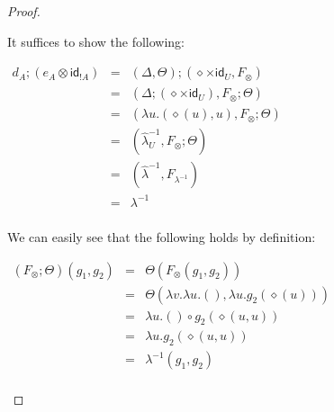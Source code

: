 \documentclass{elsarticle}
\newcommand{\id}[0]{\mathsf{id}}
\begin{document}
\begin{proof}
\begin{report}
\begin{itemize}
    It suffices to show the following:
    \begin{center}
      \begin{math}
        \begin{array}{lll}
          d_A;(e_A \otimes \id_{!A})
          & = & (\Delta,\Theta);(\diamond \times \id_U,F_\otimes)\\
          & = & (\Delta;(\diamond \times \id_U),F_\otimes;\Theta)\\
          & = & (\lambda u.(\diamond(u),u),F_\otimes;\Theta)\\
          & = & (\hat{\lambda}^{-1}_U,F_\otimes;\Theta)\\
          & = & (\hat{\lambda}^{-1},F_{\lambda^{-1}})\\
          & = & \lambda^{-1}\\
        \end{array}
      \end{math}
    \end{center}
    We can easily see that the following holds by definition:
    \begin{center}
      \begin{math}
        \begin{array}{lll}
          (F_\otimes;\Theta)(g_1,g_2)
          & = & \Theta(F_\otimes(g_1,g_2))\\
          & = & \Theta(\lambda v.\lambda u.(),\lambda u.g_2(\diamond(u)))\\
          & = & \lambda u.() \circ g_2(\diamond(u,u))\\
          & = & \lambda u.g_2(\diamond(u,u))\\
          & = & \lambda^{-1}(g_1,g_2)\\
        \end{array}
      \end{math}
    \end{center}


\end{itemize}
\end{report}
\end{proof}
\end{document}
